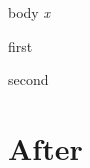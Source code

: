\documentclass{article}
\begin{document}
\begin{boxed}
body \emph{x}
\end{boxed}
\gdef\AfterA{}
\begin{grab}
first

second
\end{grab}
\gdef\AfterB{}
\section{After}\label{after}
\gdef\SatexReachedEnd{}
\end{document}
